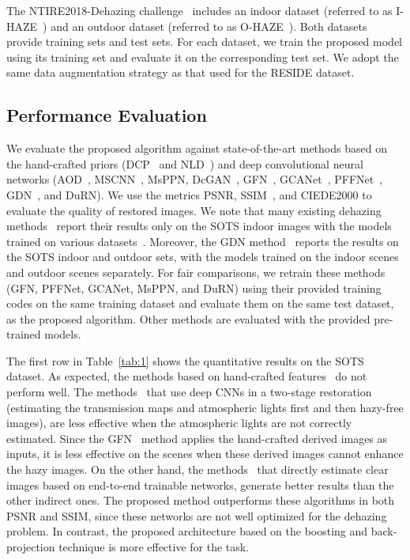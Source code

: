 \documentclass[10pt,twocolumn,letterpaper]{article}
\newcommand{\tabref}[1]{Table~\ref{tab:#1}}
\begin{document}
The NTIRE2018-Dehazing challenge~\cite{NTIRE2018} includes an indoor dataset (referred to as I-HAZE~\cite{IHAZE}) and an outdoor dataset (referred to as O-HAZE~\cite{OHAZE}).
Both datasets provide training sets and test sets.
For each dataset, we train the proposed model using its training set and evaluate it on the corresponding test set.
We adopt the same data augmentation strategy as that used for the RESIDE dataset.


  \vspace{-1.5mm}
  \subsection{Performance Evaluation}
  \label{sec:4.1}
  \vspace{-1mm}
  We evaluate the proposed algorithm against state-of-the-art methods based on the hand-crafted priors (DCP~\cite{He_dark} and NLD~\cite{NLD})
  and deep convolutional neural networks (AOD~\cite{AOD}, MSCNN~\cite{MSCNN}, MsPPN\cite{MsPPN}, DcGAN~\cite{DcGAN}, GFN~\cite{GFN}, GCANet~\cite{GCANet}, PFFNet~\cite{PFFNet}, GDN~\cite{griddehazenet}, and DuRN\cite{DuRN}).
We use the metrics PSNR, SSIM~\cite{SSIM}, and CIEDE2000 \cite{HazeRD} to evaluate the quality of restored images.
We note that many existing dehazing methods~\cite{GFN,GCANet,PFFNet,DuRN} report their results only on the SOTS indoor images with the models trained on various datasets~\cite{RESIDE, NYU, Middlebury}.
Moreover, the GDN method~\cite{griddehazenet} reports the results on the SOTS indoor and outdoor sets, with the models trained on the indoor scenes and outdoor scenes separately.
For fair comparisons, we retrain these methods (GFN, PFFNet, GCANet, MsPPN, and DuRN) using their provided training codes on the same training dataset and evaluate them on the same test dataset, as the proposed algorithm.
Other methods are evaluated with the provided pre-trained models.
  
  The first row in \tabref{1} shows the quantitative results on the SOTS dataset.
As expected, the methods based on hand-crafted features~\cite{He_dark, NLD} do not perform well.
The methods~\cite{AOD, MSCNN, DcGAN} that use deep CNNs in a two-stage restoration (estimating the transmission maps and atmospheric lights first and then hazy-free images), are less effective when the atmospheric lights are not correctly estimated.
Since the GFN~\cite{GFN} method applies the hand-crafted derived images as inputs, it is less effective on the scenes when these derived images cannot enhance the hazy images.
On the other hand, the methods~\cite{GCANet,PFFNet, MsPPN, DuRN, griddehazenet} that directly estimate clear images based on end-to-end trainable networks, generate better results than the other indirect ones.
The proposed method outperforms these algorithms in both PSNR and SSIM, since these networks are not well optimized for the dehazing problem.
In contrast, the proposed architecture based on the boosting and back-projection technique is more effective for the task.
\end{document}
